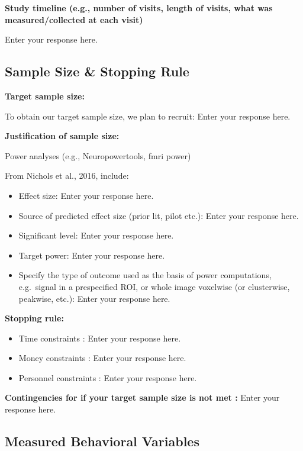 \documentclass[]{article}
\providecommand{\tightlist}{%
\setlength{\itemsep}{0pt}\setlength{\parskip}{0pt}}
\begin{document}
\textbf{Study timeline (e.g., number of visits, length of visits, what
was measured/collected at each visit)}

Enter your response here.

\hypertarget{sample-size-stopping-rule}{%
\subsection{Sample Size \& Stopping
Rule}\label{sample-size-stopping-rule}}

\textbf{Target sample size:}

To obtain our target sample size, we plan to recruit: Enter your
response here.

\textbf{Justification of sample size:}

Power analyses (e.g., Neuropowertools, fmri power)

From Nichols et al., 2016, include:

\begin{itemize}
\tightlist
\item
  Effect size: Enter your response here.
\item
  Source of predicted effect size (prior lit, pilot etc.): Enter your
  response here.
\item
  Significant level: Enter your response here.
\item
  Target power: Enter your response here.
\item
  Specify the type of outcome used as the basis of power computations,
  e.g.~signal in a prespecified ROI, or whole image voxelwise (or
  clusterwise, peakwise, etc.): Enter your response here.
\end{itemize}

\textbf{Stopping rule:}

\begin{itemize}
\tightlist
\item
  Time constraints : Enter your response here.
\item
  Money constraints : Enter your response here.
\item
  Personnel constraints : Enter your response here.
\end{itemize}

\textbf{Contingencies for if your target sample size is not met :} Enter
your response here.

\hypertarget{measured-behavioral-variables}{%
\subsection{Measured Behavioral
Variables}\label{measured-behavioral-variables}}
\end{document}
